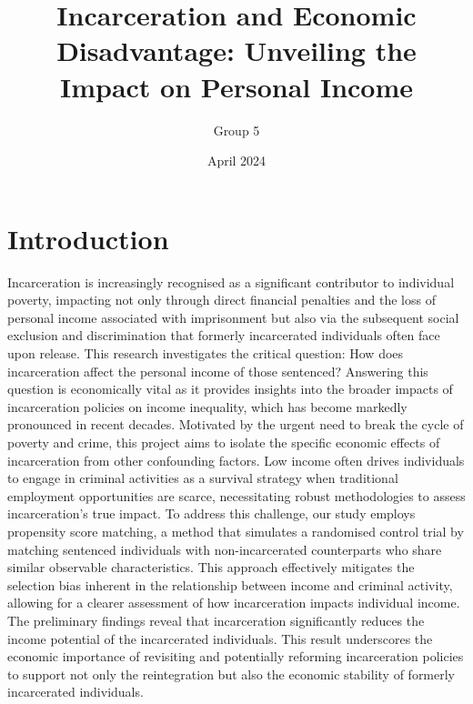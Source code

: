 \documentclass{article}[12pt]
\title{Incarceration and Economic Disadvantage: Unveiling the Impact on Personal Income}
\author{Group 5}
\date{April 2024}
\begin{document}
\maketitle

\section{Introduction} %
Incarceration is increasingly recognised as a significant contributor to individual poverty, impacting not only through direct financial penalties and the loss of personal income associated with imprisonment but also via the subsequent social exclusion and discrimination that formerly incarcerated individuals often face upon release. This research investigates the critical question: How does incarceration affect the personal income of those sentenced? Answering this question is economically vital as it provides insights into the broader impacts of incarceration policies on income inequality, which has become markedly pronounced in recent decades. Motivated by the urgent need to break the cycle of poverty and crime, this project aims to isolate the specific economic effects of incarceration from other confounding factors. Low income often drives individuals to engage in criminal activities as a survival strategy when traditional employment opportunities are scarce, necessitating robust methodologies to assess incarceration's true impact. To address this challenge, our study employs propensity score matching, a method that simulates a randomised control trial by matching sentenced individuals with non-incarcerated counterparts who share similar observable characteristics. This approach effectively mitigates the selection bias inherent in the relationship between income and criminal activity, allowing for a clearer assessment of how incarceration impacts individual income. The preliminary findings reveal that incarceration significantly reduces the income potential of the incarcerated individuals. This result underscores the economic importance of revisiting and potentially reforming incarceration policies to support not only the reintegration but also the economic stability of formerly incarcerated individuals.
\par
\end{document}
